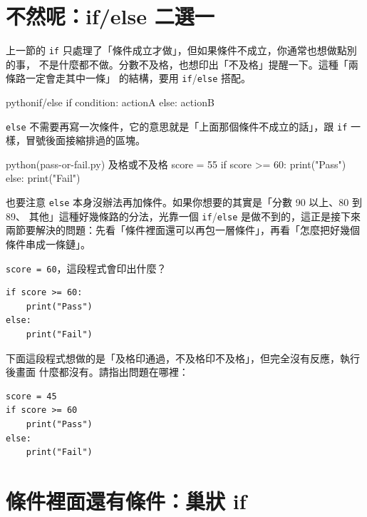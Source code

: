\section{不然呢：if/else 二選一}
\label{sec:if-else}

上一節的 \texttt{if} 只處理了「條件成立才做」，但如果條件不成立，你通常也想做點別的事，
不是什麼都不做。分數不及格，也想印出「不及格」提醒一下。這種「兩條路一定會走其中一條」
的結構，要用 \texttt{if}/\texttt{else} 搭配。

\begin{code}{python}{if/else}
if condition:
    actionA
else:
    actionB
\end{code}

\texttt{else} 不需要再寫一次條件，它的意思就是「上面那個條件不成立的話」，跟
\texttt{if} 一樣，冒號後面接縮排過的區塊。

\begin{example}{python}{(pass-or-fail.py) 及格或不及格}
score = 55
if score >= 60:
    print("Pass")
else:
    print("Fail")
\end{example}



也要注意 \texttt{else} 本身沒辦法再加條件。如果你想要的其實是「分數 90 以上、80 到 89、
其他」這種好幾條路的分法，光靠一個 \texttt{if}/\texttt{else} 是做不到的，這正是接下來
兩節要解決的問題：先看「條件裡面還可以再包一層條件」，再看「怎麼把好幾個條件串成一條鏈」。

\begin{drills}[label=drills:if-else]
\item \texttt{score = 60}，這段程式會印出什麼？
\begin{verbatim}
if score >= 60:
    print("Pass")
else:
    print("Fail")
\end{verbatim}
\item 下面這段程式想做的是「及格印通過，不及格印不及格」，但完全沒有反應，執行後畫面
什麼都沒有。請指出問題在哪裡：
\begin{verbatim}
score = 45
if score >= 60
    print("Pass")
else:
    print("Fail")
\end{verbatim}
\end{drills}

\section{條件裡面還有條件：巢狀 if}
\label{sec:nested-if}

